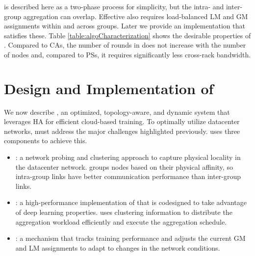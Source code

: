 

\mlha is described here as a two-phase process for simplicity, but the intra- and inter-group aggregation can overlap. Effective \mlha also requires load-balanced LM and GM assignments within and across groups. Later we provide an implementation that satisfies these. Table \ref{table:algoCharacterization} shows the desirable properties of \mlha. Compared to CAs, the number of rounds in \mlha does not increase with the number of nodes and, compared to PSs, it requires significantly less cross-rack bandwidth.

\section{Design and Implementation of \plink}

We now describe \plink, an optimized, topology-aware, and dynamic system that leverages HA for efficient cloud-based training. To optimally utilize datacenter networks, \plink must address the major challenges highlighted previously. \plink uses three components to achieve this.
\begin{itemize}[noitemsep,topsep=0pt,parsep=0pt,partopsep=0pt,leftmargin=1em]
    \item \marcopolo: a network probing and clustering approach to capture physical locality in the datacenter network. \marcopolo groups nodes based on their physical affinity, so intra-group links have better communication performance than inter-group links. %
    \item \ha: a high-performance implementation of \mlha that is codesigned to take advantage of deep learning properties. %
    \ha uses clustering information to  distribute the aggregation workload efficiently and execute the aggregation schedule.
    \item \autoplink: a mechanism that tracks training performance and adjusts the current GM and LM assignments to adapt to changes in the network conditions.
\end{itemize}

